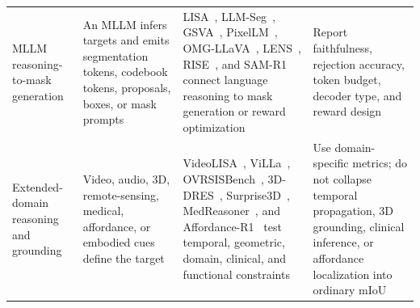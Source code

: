 \begin{table}[t]
\begin{tabularx}{\textwidth}{>{\raggedright\arraybackslash}p{}>{\raggedright\arraybackslash}p{}>{\raggedright\arraybackslash}p{}>{\raggedright\arraybackslash}X}
MLLM reasoning-to-mask generation & An MLLM infers targets and emits segmentation tokens, codebook tokens, proposals, boxes, or mask prompts & LISA~\citep{xlaiLisaReasoningSegmentation2024}, LLM-Seg~\citep{jwangLlmsegBridgingImage2024}, GSVA~\citep{xiaGsvaGeneralizedSegmentation2024}, PixelLM~\citep{renPixellmPixelReasoning2024}, OMG-LLaVA~\citep{zhangOmgllavaBridgingImagelevel2024}, LENS~\citep{zhuLensLearningSegment2026}, RISE~\citep{zhouReasoningImplicitSelfsupervised2026}, and SAM-R1~\citep{huangSamr1LeveragingSam2026} connect language reasoning to mask generation or reward optimization & Report faithfulness, rejection accuracy, token budget, decoder type, and reward design \\
Extended-domain reasoning and grounding & Video, audio, 3D, remote-sensing, medical, affordance, or embodied cues define the target & VideoLISA~\citep{baiOneTokenSeg2024}, ViLLa~\citep{zhengVillaVideoReasoning2025}, OVRSISBench~\citep{libExploringEfficientOpenvocabulary2026}, 3D-DRES~\citep{chen3DDRESDetailed3D2026}, Surprise3D~\citep{huangSurprise3dDatasetSpatial2026}, MedReasoner~\citep{yanMedreasonerReinforcementLearning2026}, and Affordance-R1~\citep{wangAffordancer1ReinforcementLearning2026} test temporal, geometric, domain, clinical, and functional constraints & Use domain-specific metrics; do not collapse temporal propagation, 3D grounding, clinical inference, or affordance localization into ordinary mIoU \\
\bottomrule
\end{tabularx}
\end{table}

